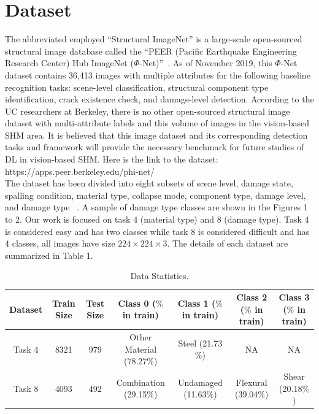 \documentclass[10pt,twocolumn,letterpaper]{article}
\begin{document}
\section{Dataset}
The abbreviated employed “Structural ImageNet” is a large-scale open-sourced structural image database called the “PEER (Pacific Earthquake Engineering Research Center) Hub ImageNet ($\Phi$-Net)”~\cite{Imagenet01}. As of November 2019, this $\Phi$-Net dataset contains 36,413 images with multiple attributes for the following baseline recognition tasks: scene-level classification, structural component type identification, crack existence check, and damage-level detection. According to the UC researchers at Berkeley, there is no other open-sourced structural image dataset with multi-attribute labels and this volume of images in the vision-based SHM area. It is believed that this image dataset and its corresponding detection tasks and framework will provide the necessary benchmark for future studies of DL in vision-based SHM.
Here is the link to the dataset: 
https://apps.peer.berkeley.edu/phi-net/ 
\\
The dataset has been divided into eight subsets of scene level, damage state, spalling condition, material type, collapse mode, component type, damage level, and damage type~\cite{Gao01} \cite{Gao02} \cite{Gao03}. A sample of damage type classes are shown in the Figures 1 to 2. Our work is focused on task 4 (material type) and 8 (damage type). 
Task 4 is considered easy and has two classes while task 8 is considered difficult and has 4 classes, all images have size $224\times224\times3$. The details of each dataset are summarized in Table 1.

\begin{table}
\begin{center}
\begin{tabular}{|c|c|c|c|c|c|c|}
\hline
Dataset & Train Size & Test Size & Class 0 ($\%$ in train) &  Class 1 ($\%$ in train) & Class 2  ($\%$ in train) & Class 3  ($\%$ in train) \\
\hline\hline
Task 4 & 8321 &  979 & Other Material (78.27$\%$) & Steel (21.73$\%$) & NA & NA \\
\hline
Task 8 & 4093 & 492 & Combination  (29.15$\%$)  & Undamaged (11.63$\%$) & Flexural (39.04$\%$) & Shear (20.18$\%$) \\
\hline
\end{tabular}
\end{center}
\caption{Data Statistics.}
\label{tab:dataset}
\end{table}
\end{document}
